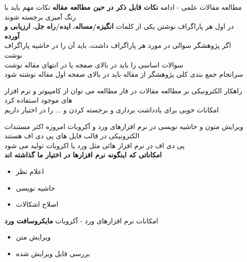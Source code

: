 \documentclass[12pt]{beamer}
\makeatletter
\newcommand{\rtlist}{\raggedleft\rightskip\@totalleftmargin}
\newcommand{\framefontsizelarge}{\fontsize{18pt}{0pt}\selectfont}
\newcommand{\frametitlefontsize}{\fontsize{20pt}{0pt}\selectfont}
\newcommand{\defaultvspace}{\vspace{5mm}}
\makeatother
\begin{document}
\begin{persian}
	\begin{frame}{\frametitlefontsize مطالعه مقالات علمی - ادامه}
		\textbf{\large{نکات قابل ذکر در حین مطالعه مقاله}}\newline\newline
		نکات مهم باید با رنگ آمیزی برجسته شوند\\
		در اول هر پاراگراف نوشتن یکی از کلمات \textbf{انگیزه/مساله}، \textbf{ایده/راه جل}، \textbf{ارزیابی و آورده}\\
		اگر پژوهشگر سوالی در مورد هر پاراگراف داشت، باید آن را در حاشیه پاراگراف نوشت\\
		سوالات اساسی را باید در بالای صفجه یا در انتهای مقاله نوشت\\
		سرانجام جمع بندی کلی پژوهشگر از مقاله باید در بالای صفحه اول مقاله نوشته شود\\
	\end{frame}
	
	\begin{frame}{\frametitlefontsize راهکار الکترونیکی بر مطالعه مقالات}
		\framefontsizelarge
		در فاز مطالعه می توان از کامپیوتر و نرم افزار های موجود استفاده کرد \defaultvspace\\
		امکانات خوبی برای یادداشت برداری و برجسته کردن و ... را در اختیار داریم \\
	\end{frame}

	\begin{frame}{\frametitlefontsize ویرایش متون و حاشیه نویسی در نرم افزارهای ورد و آکروبات}
		\framefontsizelarge
		امروزه اکثر مستندات الکترونیکی در قالب فایل های پی دی اف هستند \defaultvspace\\
		پی دی اف در نرم افزار هائی مثل ورد یا اکروبات تولید می شود \defaultvspace\\
		\textbf{امکاناتی که اینگونه نرم افزارها در اختیار ما گذاشته اند}
		\begin{itemize}\rtlist
			\item اعلام نظر
			\item حاشیه نویسی 
			\item اصلاح اشکالات
		\end{itemize}
	\end{frame}
	
	\begin{frame}{\frametitlefontsize امکانات نرم افزارهای ورد - آکروبات}
		\textbf{مایکروسافت ورد}
		\begin{itemize}\rtlist
			\item ویرایش متن
			\item بررسی فایل ویرایش شده
		\end{itemize}
		

\end{frame}
\end{persian}
\end{document}
